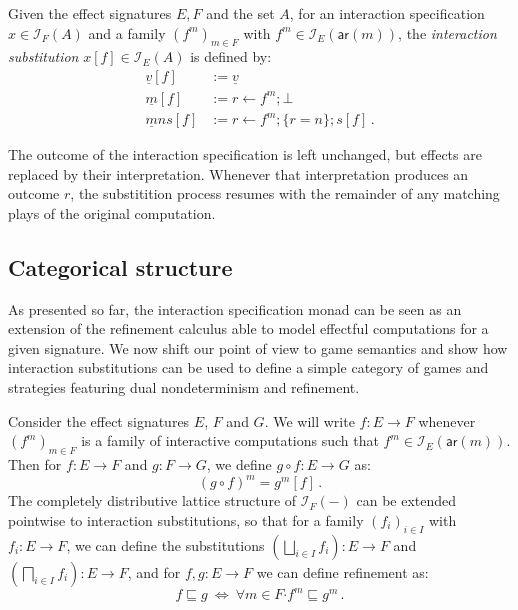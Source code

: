 \documentclass[sigplan,screen]{acmart}
\newcommand{\kw}[1]{\ensuremath{ \mathsf{#1} }}
\newcommand{\bdot}{\boldsymbol{\cdot}}
\begin{document}
\begin{definition}
Given the effect signatures $E, F$ and the set $A$,
for an interaction specification $x \in \mathcal{I}_F(A)$
and a family $(f^m)_{m \in F}$ with $f^m \in \mathcal{I}_E(\kw{ar}(m))$,
the \emph{interaction substitution} $x[f] \in \mathcal{I}_E(A)$
is defined by:
\begin{align*}
  \underline{v}[f] &:= \underline{v} \\
  \underline{m}[f] &:= r \leftarrow f^m ; \bot \\
  \underline{m}ns[f] &:= r \leftarrow f^m ; \{r = n\} ; s[f] \,.
\end{align*}
\end{definition}

The outcome of the interaction specification is left unchanged,
but effects are replaced by their interpretation.
Whenever that interpretation produces an outcome $r$,
the substitition process resumes with the remainder of any
matching plays of the original computation.


\subsection{Categorical structure} \label{sec:intm:cat} %

As presented so far,
the interaction specification monad
can be seen as an extension of the refinement calculus
able to model effectful computations
for a given signature.
We now shift our point of view to game semantics
and show how interaction substitutions
can be used to define a simple category of games and strategies
featuring dual nondeterminism and refinement.

\begin{definition}
Consider the effect signatures $E$, $F$ and $G$.
We will write $f : E \rightarrow F$
whenever $(f^m)_{m \in F}$ is a family of interactive computations
such that $f^m \in \mathcal{I}_E(\kw{ar}(m))$.
Then for $f : E \rightarrow F$ and $g : F \rightarrow G$,
we define $g \circ f : E \rightarrow G$ as:
\[ (g \circ f)^m = g^m[f] \,. \]
The completely distributive lattice structure
of $\mathcal{I}_F(-)$ can be extended pointwise
to interaction substitutions,
so that for a family $(f_i)_{i \in I}$
with $f_i : E \rightarrow F$,
we can define the substitutions
$(\bigsqcup_{i \in I} f_i) : E \rightarrow F$ and
$(\bigsqcap_{i \in I} f_i) : E \rightarrow F$,
and for $f, g : E \rightarrow F$
we can define refinement as:
\[
    f \sqsubseteq g \: \Leftrightarrow \:
    \forall m \in F \bdot f^m \sqsubseteq g^m \,.
\]
\end{definition}
\end{document}

